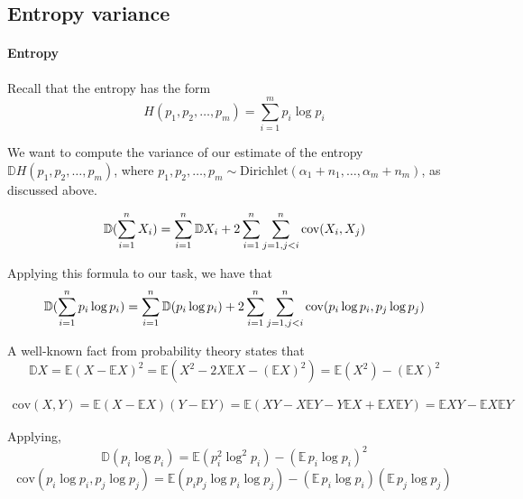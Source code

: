 \documentclass{article}
\begin{document}
\subsection{Entropy variance}
\paragraph{Entropy} Recall that the entropy has the form
\begin{equation*}
H(p_1, p_2, \ldots, p_m) = \sum_{i = 1}^m{p_i \log p_i}
\end{equation*}

We want to compute the variance of our estimate of the entropy $\mathbb{D}H(p_1, p_2, \ldots, p_m)$, where $p_1, p_2, \ldots, p_m \sim \textrm{Dirichlet}(\alpha_1 + n_1, \ldots, \alpha_m + n_m)$, as discussed above.

\begin{equation}
\mathbb{D}(\sum_{i = 1}^n{X_i}) = \sum_{i=1}^n{\mathbb{D}X_i} + 2 \sum_{i = 1}^n{\sum_{j = 1, \\ j < i}^n{{\textrm{cov}(X_i, X_j)}}}
\end{equation}

Applying this formula to our task, we have that
\begin{equation}
\mathbb{D}(\sum_{i = 1}^n{p_i \log{p_i}}) = \sum_{i=1}^n{\mathbb{D}(p_i \log{p_i})} + 2 \sum_{i = 1}^n{\sum_{j = 1, \\ j < i}^n{{\textrm{cov}(p_i \log{p_i}, p_j \log{p_j})}}}
\end{equation}

A well-known fact from probability theory states that
\begin{equation}
\mathbb{D}X = \mathbb{E}(X - \mathbb{E}X)^2 = \mathbb{E}(X^2 - 2X \mathbb{E}X - (\mathbb{E}X)^2) = \mathbb{E}(X^2) - (\mathbb{E}X)^2
\end{equation}

\begin{multline}
\textrm{cov}(X, Y) = \mathbb{E}(X - \mathbb{E}X)(Y - \mathbb{E}Y) = \mathbb{E}(XY - X \mathbb{E}Y - Y \mathbb{E}X + \mathbb{E}X\mathbb{E}Y) = \mathbb{E}XY - \mathbb{E}X\mathbb{E}Y
\end{multline}

Applying,
\begin{equation}
\mathbb{D}(p_i \log{p_i}) = \mathbb{E}(p_i^2 \log^2{p_i}) - (\mathbb{E} \, p_i \log{p_i})^2 
\end{equation}
\begin{equation}
\textrm{cov}(p_i \log{p_i}, p_j \log{p_j}) = \mathbb{E}(p_i p_j \log{p_i} \log{p_j}) - (\mathbb{E} \, p_i \log{p_i})(\mathbb{E} \, p_j \log{p_j})
\end{equation}
\end{document}
